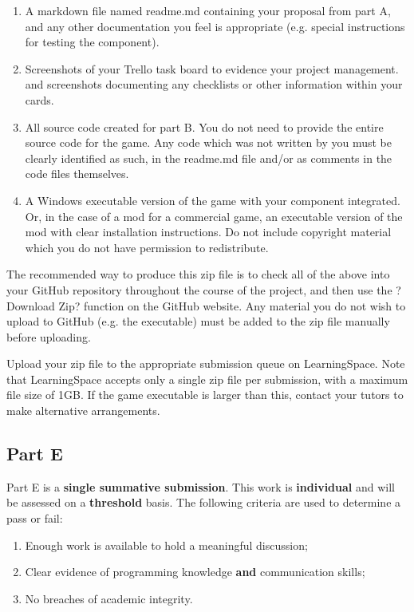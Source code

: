 \documentclass{../fal_assignment}
\begin{document}
\begin{enumerate}[label=(\alph*)]
	\item A markdown file named readme.md containing your proposal from part A, and any other documentation you feel is appropriate (e.g. special instructions for testing the component). 
	\item Screenshots of your Trello task board to evidence your project management. and screenshots documenting any checklists or other information within your cards.
	\item All source code created for part B. You do not need to provide the entire source code for the game. Any code which was not written by you must be clearly identified as such, in the readme.md file and/or as comments in the code files themselves. 
	\item A Windows executable version of the game with your component integrated. Or, in the case of a mod for a commercial game, an executable version of the mod with clear installation instructions. Do not include copyright material which you do not have permission to redistribute. 
\end{enumerate}
	
The recommended way to produce this zip file is to check all of the above into your GitHub repository throughout the course of the project, and then use the ?Download Zip? function on the GitHub website. Any material you do not wish to upload to GitHub (e.g. the executable) must be added to the zip file manually before uploading. 

Upload your zip file to the appropriate submission queue on LearningSpace. Note that LearningSpace accepts only a single zip file per submission, with a maximum file size of 1GB. If the game executable is larger than this, contact your tutors to make alternative arrangements.

\subsection*{Part E}

Part E is a \textbf{single summative submission}. This work is \textbf{individual} and will be assessed on a \textbf{threshold} basis.  The following criteria are used to determine a pass or fail:

\begin{enumerate}[label=(\alph*)]
	\item Enough work is available to hold a meaningful discussion;
	\item Clear evidence of programming knowledge \textbf{and} communication skills;
	\item No breaches of academic integrity.
\end{enumerate}
\end{document}

